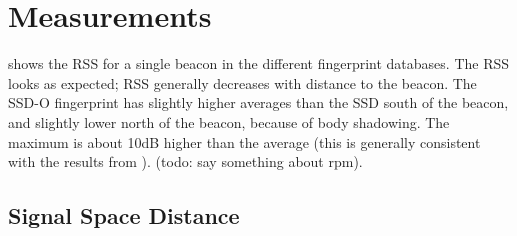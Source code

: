 \section{Measurements}

 shows the RSS for a single beacon in the different fingerprint databases.
The RSS looks as expected; RSS generally decreases with distance to the beacon.
The SSD-O fingerprint has slightly higher averages than the SSD south of the beacon, and slightly lower north of the beacon, because of body shadowing.
The maximum is about 10dB higher than the average (this is generally consistent with the results from ).
(todo: say something about rpm).

\subsection{Signal Space Distance}


